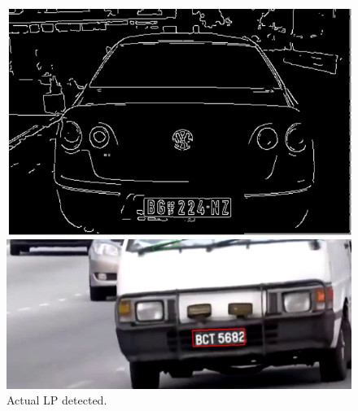 \documentclass[letterpaper,12pt]{article}
\begin{document}
\begin{figure}
	\centering
	\begin{minipage}[b]{.4\textwidth}
		\centering \includegraphics[width=0.8\columnwidth]{edge.png}
		
		\caption{
			\label{fig:9} %
			LP Edge finder.
		}
		
	\end{minipage}\qquad
	\begin{minipage}[b]{.4\textwidth}
		
		\centering \includegraphics[width=0.8\columnwidth]{plate_detcted.png}
		
		\caption{
			\label{fig:10} %
			Actual LP detected.
		}
		
	\end{minipage}
\end{figure}
\end{document}

